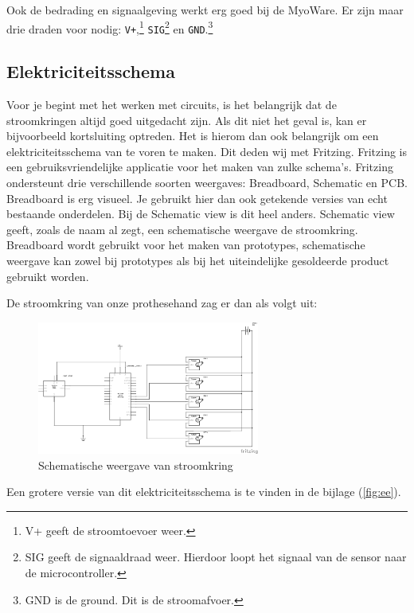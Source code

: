 Ook de bedrading en signaalgeving werkt erg goed bij de MyoWare. Er zijn
maar drie draden voor nodig: \texttt{V+},\footnote{V+ geeft de
  stroomtoevoer weer.} \texttt{SIG}\footnote{SIG geeft de signaaldraad
  weer. Hierdoor loopt het signaal van de sensor naar de
  microcontroller.} en \texttt{GND}.\footnote{GND is de ground. Dit is
  de stroomafvoer.}

\hypertarget{elektriciteitsschema}{%
\subsection{Elektriciteitsschema}\label{elektriciteitsschema}}

Voor je begint met het werken met circuits, is het belangrijk dat de
stroomkringen altijd goed uitgedacht zijn. Als dit niet het geval is,
kan er bijvoorbeeld kortsluiting optreden. Het is hierom dan ook
belangrijk om een elektriciteitsschema van te voren te maken. Dit deden
wij met Fritzing. Fritzing is een gebruiksvriendelijke applicatie voor
het maken van zulke schema's. Fritzing ondersteunt drie verschillende
soorten weergaves: Breadboard, Schematic en PCB. Breadboard is erg
visueel. Je gebruikt hier dan ook getekende versies van echt bestaande
onderdelen. Bij de Schematic view is dit heel anders. Schematic view
geeft, zoals de naam al zegt, een schematische weergave de stroomkring.
Breadboard wordt gebruikt voor het maken van prototypes, schematische
weergave kan zowel bij prototypes als bij het uiteindelijke gesoldeerde
product gebruikt worden.

De stroomkring van onze prothesehand zag er dan als volgt uit:

\begin{figure}
\centering
\includegraphics[width=0.65\textwidth,height=\textheight]{img/image_23.png}
\caption{Schematische weergave van stroomkring\label{fig:stroom}}
\end{figure}

Een grotere versie van dit elektriciteitsschema is te vinden in de
bijlage (\cref{fig:ee}).

